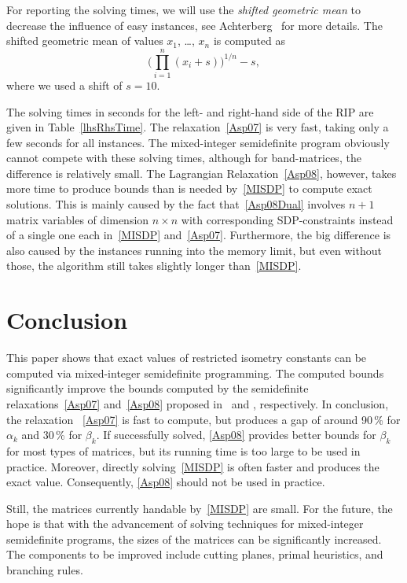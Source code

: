 \documentclass[journal]{IEEEtran}
\begin{document}
For reporting the solving times, we will use the \emph{shifted
  geometric mean} to decrease the influence of easy instances, see
Achterberg~\cite{SCIP} for more details. The shifted geometric
mean of values $x_1$, \dots, $x_n$ is computed as
\begin{equation*}
  \Big( \prod_{i=1}^n (x_i + s)\Big)^{1/n} - s,
\end{equation*}
where we used a shift of $s=10$.

The solving times in seconds for the left- and right-hand side of the RIP are given in
Table~\ref{lhsRhsTime}. The relaxation~\eqref{Asp07}
is very fast, taking only a few seconds for all instances. The mixed-integer semidefinite program obviously
cannot compete with these solving times, although for band-matrices, the difference is relatively
small. The Lagrangian Relaxation~\eqref{Asp08}, however, takes more time to produce bounds than is needed
by~\eqref{MISDP} to compute exact solutions. This is mainly caused by the fact that~\eqref{Asp08Dual} involves
$n+1$ matrix variables of dimension $n\times n$ with corresponding SDP-constraints instead of a 
single one each in~\eqref{MISDP} and~\eqref{Asp07}.
Furthermore, the big difference is also caused by the instances running into the 
memory limit, but even without those, the algorithm still takes slightly longer than~\eqref{MISDP}.



\section{Conclusion}

\noindent
This paper shows that exact values of restricted isometry constants can be
computed via mixed-integer semidefinite programming. The computed bounds
significantly improve the bounds computed by the semidefinite
relaxations~\eqref{Asp07} and~\eqref{Asp08}
proposed in~\cite{Asp07} and \cite{Asp08}, respectively. In conclusion, the relaxation~
\eqref{Asp07} is fast to compute, but produces a gap of around 90\,\% for
$\alpha_k$ and 30\,\% for $\beta_k$. If successfully solved, 
\eqref{Asp08} provides better bounds for $\beta_k$ for most types of 
matrices, but its running time is too large
to be used in practice. Moreover, directly solving~\eqref{MISDP} is often
faster and produces the exact value. Consequently, 
\eqref{Asp08} should not be used in practice.

Still, the matrices currently handable by~\eqref{MISDP} are small. For the
future, the hope is that with the advancement of solving techniques for
mixed-integer semidefinite programs, the sizes of the matrices can be
significantly increased. The components to be improved include cutting
planes, primal heuristics, and branching rules.



\end{document}

